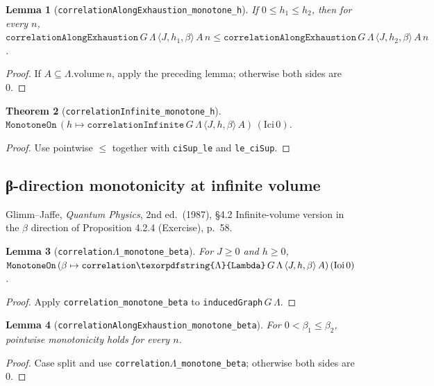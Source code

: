\documentclass[a4paper,11pt]{article}
\newtheorem{theorem}{Theorem}
\newtheorem{lemma}[theorem]{Lemma}
\newcommand{\LeanLambda}{\texorpdfstring{\ensuremath{\Lambda}}{Lambda}}
\begin{document}
\begin{lemma}[\texttt{correlationAlongExhaustion\_monotone\_h}]
If $0 \le h_1 \le h_2$, then for every $n$,
$\texttt{correlationAlongExhaustion}\,G\,\Lambda\,\langle J,h_1,\beta\rangle\,A\,n
  \le \texttt{correlationAlongExhaustion}\,G\,\Lambda\,\langle J,h_2,\beta\rangle\,A\,n$.
\end{lemma}

\begin{proof}
If $A \subseteq \Lambda.\text{volume}\,n$, apply the preceding lemma;
otherwise both sides are 0.
\end{proof}

\begin{theorem}[\texttt{correlationInfinite\_monotone\_h}]
$\texttt{MonotoneOn}\,(h \mapsto \texttt{correlationInfinite}\,G\,\Lambda\,\langle J,h,\beta\rangle\,A)\,(\mathrm{Ici}\,0)$.
\end{theorem}

\begin{proof}
Use pointwise $\le$ together with \texttt{ciSup\_le} and \texttt{le\_ciSup}.
\end{proof}

\subsection{β-direction monotonicity at infinite volume}

Glimm--Jaffe, \textit{Quantum Physics}, 2nd ed.\ (1987), \S 4.2
Infinite-volume version in the $\beta$ direction of Proposition 4.2.4
(Exercise), p.\ 58.

\begin{lemma}[\texttt{correlation\LeanLambda\_monotone\_beta}]
For $J \ge 0$ and $h \ge 0$,
$\texttt{MonotoneOn}\,(\beta \mapsto \texttt{correlation\LeanLambda}\,G\,\Lambda\,\langle J,h,\beta\rangle\,A)\,(\mathrm{Ioi}\,0)$.
\end{lemma}

\begin{proof}
Apply \texttt{correlation\_monotone\_beta} to
\texttt{inducedGraph}\,$G\,\Lambda$.
\end{proof}

\begin{lemma}[\texttt{correlationAlongExhaustion\_monotone\_beta}]
For $0 < \beta_1 \le \beta_2$, pointwise monotonicity holds for every $n$.
\end{lemma}

\begin{proof}
Case split and use \texttt{correlation\LeanLambda\_monotone\_beta}; otherwise both
sides are 0.
\end{proof}
\end{document}

